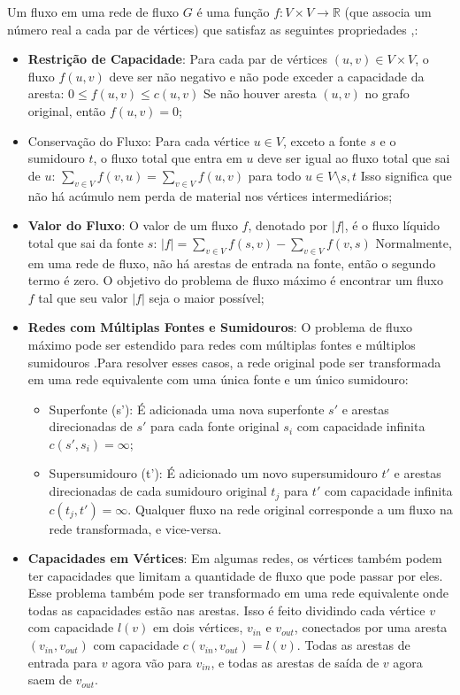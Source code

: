 \documentclass[12pt]{article}
\begin{document}
Um fluxo em uma rede de fluxo $G$ é uma função $f: V \times V \rightarrow \mathbb{R}$ (que associa um número real a cada par de vértices) que satisfaz as seguintes propriedades \cite{ahuja1993},:

\begin{itemize}
    \item \textbf{Restrição de Capacidade}: Para cada par de vértices $(u, v) \in V \times V$, o fluxo $f(u, v)$ deve ser não negativo e não pode exceder a capacidade da aresta: $0 \le f(u, v) \le c(u, v)$ Se não houver aresta $(u, v)$ no grafo original, então $f(u, v) = 0$;
    \item Conservação do Fluxo: Para cada vértice $u \in V$, exceto a fonte $s$ e o sumidouro $t$, o fluxo total que entra em $u$ deve ser igual ao fluxo total que sai de $u$: $\sum_{v \in V} f(v, u) = \sum_{v \in V} f(u, v)$ para todo $u \in V \setminus {s, t}$ Isso significa que não há acúmulo nem perda de material nos vértices intermediários;
    \item \textbf{Valor do Fluxo}: O valor de um fluxo $f$, denotado por $|f|$, é o fluxo líquido total que sai da fonte $s$: $|f| = \sum_{v \in V} f(s, v) - \sum_{v \in V} f(v, s)$ Normalmente, em uma rede de fluxo, não há arestas de entrada na fonte, então o segundo termo é zero. O objetivo do problema de fluxo máximo é encontrar um fluxo $f$ tal que seu valor $|f|$ seja o maior possível;
    \item \textbf{Redes com Múltiplas Fontes e Sumidouros}: O problema de fluxo máximo pode ser estendido para redes com múltiplas fontes e múltiplos sumidouros \cite{goldberg1988,ahuja1993}.Para resolver esses casos, a rede original pode ser transformada em uma rede equivalente com uma única fonte e um único sumidouro:
    \begin{itemize}
        \item Superfonte (s’): É adicionada uma nova superfonte $s'$ e arestas direcionadas de $s'$ para cada fonte original $s_i$ com capacidade infinita $c(s', s_i) = \infty$;
        \item Supersumidouro (t’): É adicionado um novo supersumidouro $t'$ e arestas direcionadas de cada sumidouro original $t_j$ para $t'$ com capacidade infinita $c(t_j, t') = \infty$. Qualquer fluxo na rede original corresponde a um fluxo na rede transformada, e vice-versa.
    \end{itemize}
    \item \textbf{ Capacidades em Vértices}: Em algumas redes, os vértices também podem ter capacidades que limitam a quantidade de fluxo que pode passar por eles. Esse problema também pode ser transformado em uma rede equivalente onde todas as capacidades estão nas arestas. Isso é feito dividindo cada vértice $v$ com capacidade $l(v)$ em dois vértices, $v_{in}$ e $v_{out}$, conectados por uma aresta $(v_{in}, v_{out})$ com capacidade $c(v_{in}, v_{out}) = l(v)$. Todas as arestas de entrada para $v$ agora vão para $v_{in}$, e todas as arestas de saída de $v$ agora saem de $v_{out}$.
\end{itemize}
 
\end{document}
